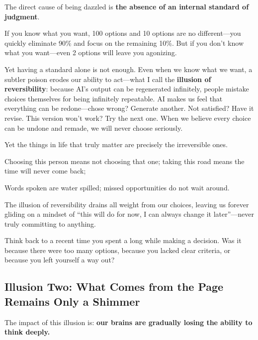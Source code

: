 \vspace{1em}

The direct cause of being dazzled is \textbf{the absence of an internal standard of judgment}.

If you know what you want, 100 options and 10 options are no different---you quickly eliminate 90\% and focus on the remaining 10\%. But if you don't know what you want---even 2 options will leave you agonizing.

\vspace{1em}

Yet having a standard alone is not enough. Even when we know what we want, a subtler poison erodes our ability to act---what I call the \textbf{illusion of reversibility}: because AI's output can be regenerated infinitely, people mistake choices themselves for being infinitely repeatable. AI makes us feel that everything can be redone---chose wrong? Generate another. Not satisfied? Have it revise. This version won't work? Try the next one. When we believe every choice can be undone and remade, we will never choose seriously.

\vspace{1em}

Yet the things in life that truly matter are precisely the irreversible ones.

Choosing this person means not choosing that one; taking this road means the time will never come back;

Words spoken are water spilled; missed opportunities do not wait around.

The illusion of reversibility drains all weight from our choices, leaving us forever gliding on a mindset of ``this will do for now, I can always change it later''---never truly committing to anything.

\begin{thinkbox}[Reflection]
Think back to a recent time you spent a long while making a decision.
Was it because there were too many options, because you lacked clear criteria, or because you left yourself a way out?
\end{thinkbox}

\newpage
\subsection{Illusion Two: What Comes from the Page Remains Only a Shimmer}
The impact of this illusion is: \textbf{our brains are gradually losing the ability to think deeply.}

